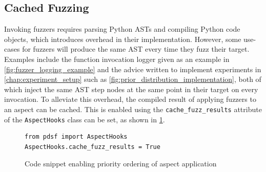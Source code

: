 \subsection{Cached Fuzzing}
\label{subsec:cached_fuzzing}

Invoking fuzzers requires parsing Python ASTs and compiling Python code objects,
which introduces overhead in their implementation. However, some use-cases for
fuzzers will produce the same AST every time they fuzz their target. Examples
include the function invocation logger given as an example in
\cref{fig:fuzzer_logging_example} and the advice written to implement
experiments in \cref{chap:experiment_setup} such as
\cref{fig:prior_distribution_implementation}, both of which inject the same AST
step nodes at the same point in their target on every invocation. To alleviate
this overhead, the compiled result of applying fuzzers to an aspect can be
cached. This is enabled using the \lstinline{cache_fuzz_results} attribute of
the \lstinline{AspectHooks} class can be set, as shown in
\cref{fig:enabling_fuzzer_caching}.

\begin{figure}[h]
    \begin{lstlisting}[style=footnotesize_python]
from pdsf import AspectHooks
AspectHooks.cache_fuzz_results = True
    \end{lstlisting}
    \caption{Code snippet enabling priority ordering of aspect application}
    \label{fig:enabling_fuzzer_caching}
\end{figure}


